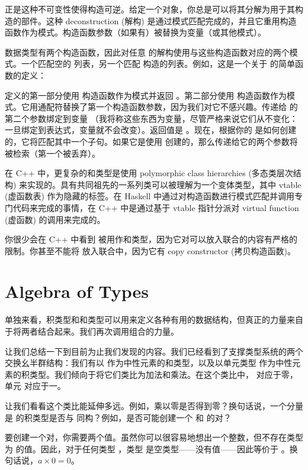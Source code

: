 正是这种不可变性使得构造可逆。给定一个对象，你总是可以将其分解为用于其构造的部件。这种 deconstruction (解构) 是通过模式匹配完成的，并且它重用构造函数作为模式。构造函数参数（如果有）被替换为变量（或其他模式）。

 数据类型有两个构造函数，因此对任意  的解构使用与这些构造函数对应的两个模式。一个匹配空的  列表，另一个匹配  构造的列表。例如，这是一个关于  的简单函数的定义：

 定义的第一部分使用  构造函数作为模式并返回 。第二部分使用  构造函数作为模式。它用通配符替换了第一个构造函数参数，因为我们对它不感兴趣。传递给  的第二个参数绑定到变量 （我将称这些东西为变量，尽管严格来说它们从不变化：一旦绑定到表达式，变量就不会改变）。返回值是 。现在，根据你的  是如何创建的，它将匹配其中一个子句。如果它是使用  创建的，那么传递给它的两个参数将被检索（第一个被丢弃）。

在 C++ 中，更复杂的和类型是使用 polymorphic class hierarchies (多态类层次结构) 来实现的。具有共同祖先的一系列类可以被理解为一个变体类型，其中 vtable (虚函数表) 作为隐藏的标签。在 Haskell 中通过对构造函数进行模式匹配并调用专门代码来完成的事情，在 C++ 中是通过基于 vtable 指针分派对 virtual function (虚函数) 的调用来完成的。

你很少会在 C++ 中看到  被用作和类型，因为它对可以放入联合的内容有严格的限制。你甚至不能将  放入联合中，因为它有 copy constructor (拷贝构造函数)。

\section{Algebra of Types}

单独来看，积类型和和类型可以用来定义各种有用的数据结构，但真正的力量来自于将两者结合起来。我们再次调用组合的力量。

让我们总结一下到目前为止我们发现的内容。我们已经看到了支撑类型系统的两个交换幺半群结构：我们有以  作为中性元素的和类型，以及以单元类型 \code{()} 作为中性元素的积类型。我们倾向于将它们类比为加法和乘法。在这个类比中， 对应于零，单元 \code{()} 对应于一。

让我们看看这个类比能延伸多远。例如，乘以零是否得到零？换句话说，一个分量是  的积类型是否与  同构？例如，是否可能创建一个  和  的对？

要创建一个对，你需要两个值。虽然你可以很容易地想出一个整数，但不存在类型为  的值。因此，对于任何类型 ，类型  是空类型——没有值——因此等价于 。换句话说，$a \times 0 = 0$。

